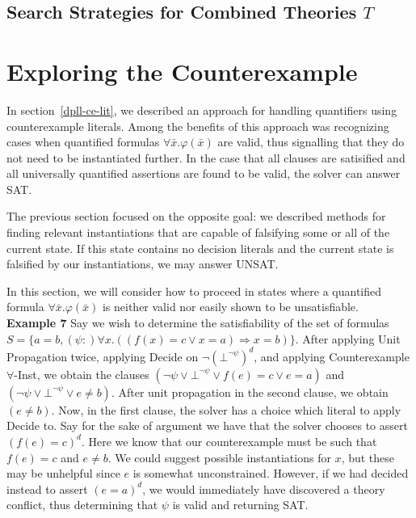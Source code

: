 \documentclass{llncs}
\begin{document}
\subsection{Search Strategies for Combined Theories $T$}

\section{Exploring the Counterexample}

In section~\ref{dpll-ce-lit}, we described an approach for handling quantifiers using counterexample literals.
Among the benefits of this approach was recognizing cases when quantified formulas $\forall \bar{x}. \varphi( \bar{x} )$ are valid, thus signalling that they do not need to be instantiated further.
In the case that all clauses are satisified and all universally quantified assertions are found to be valid, the solver can answer SAT.

The previous section focused on the opposite goal: we described methods for finding relevant instantiations that are capable of falsifying some or all of the current state.
If this state contains no decision literals and the current state is falsified by our instantiations, we may answer UNSAT.

In this section, we will consider how to proceed in states where a quantified formula $\forall \bar{x}. \varphi( \bar{x} )$ is neither valid nor easily shown to be unsatisfiable. \\

{\bf Example 7} 
Say we wish to determine the satisfiability of the set of formulas $S = \{ a = b, (\psi :) \forall x. ((f(x) = c \vee x = a) \Rightarrow x = b) \}$.
After applying Unit Propagation twice, applying Decide on $\neg (\bot^{ \neg \psi })^d$, and applying Counterexample $\forall$-Inst, we obtain the clauses $( \neg \psi \vee \bot^{ \neg \psi } \vee f(e) = c \vee e = a )$ and $( \neg \psi \vee \bot^{ \neg \psi } \vee e \neq b )$.
After unit propagation in the second clause, we obtain $( e \neq b )$.
Now, in the first clause, the solver has a choice which literal to apply Decide to.
Say for the sake of argument we have that the solver chooses to assert $( f(e) = c )^d$.
Here we know that our counterexample must be such that $f( e ) = c$ and $e \neq b$.
We could suggest possible instantiations for $x$, but these may be unhelpful since $e$ is somewhat unconstrained.
However, if we had decided instead to assert $( e = a )^d$, we would immediately have discovered a theory conflict, thus determining that $\psi$ is valid and returning SAT. \\
\end{document}
